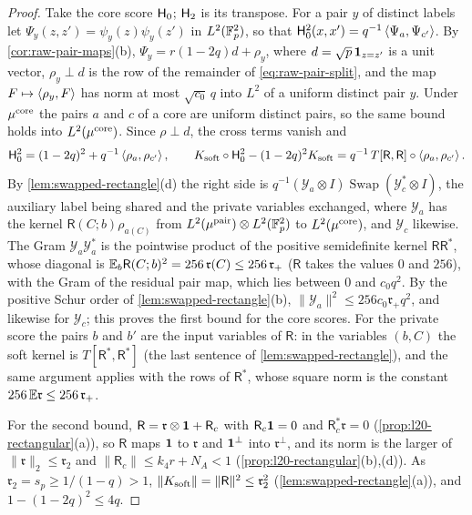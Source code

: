 \begin{proof}
Take the core score $\mathsf H_{0}$; $\mathsf H_{2}$ is its transpose. For a pair $y$ of distinct labels let
$\Psi_y(z,z')=\psi_y(z)\psi_y(z')$ in $L^2(\mathbb F_p^2)$, so that
$\mathsf H_{0}^2(x,x')=q^{-1}\left\langle \Psi_a,\Psi_{c'}\right\rangle$. By \cref{cor:raw-pair-maps}(b),
$\Psi_y=r(1-2q)d+\rho_y$, where $d=\sqrt p\,\mathbf 1_{z=z'}$ is a unit vector, $\rho_y\perp d$
is the row of the remainder of \eqref{eq:raw-pair-split}, and the map
$F\mapsto\left\langle \rho_y,F\right\rangle$ has norm at most $\sqrt{c_0}\,q$ into $L^2$ of a uniform distinct
pair $y$. Under $\mu^{\rm core}$ the pairs $a$ and $c$ of a core are uniform distinct
pairs, so the same bound holds into $L^2(\mu^{\rm core})$. Since $\rho\perp d$, the cross terms vanish and
\[
 \mathsf H_{0}^2=(1-2q)^2+q^{-1}\left\langle \rho_a,\rho_{c'}\right\rangle,\qquad
 K_{\rm soft}\circ\mathsf H_{0}^2-(1-2q)^2K_{\rm soft}
 =q^{-1}\,T[\mathsf R,\mathsf R]\circ\left\langle \rho_a,\rho_{c'}\right\rangle .
\]
By \cref{lem:swapped-rectangle}(d) the right side is
$q^{-1}(\mathcal Y_a\otimes I)\operatorname{Swap}(\mathcal Y_c^*\otimes I)$, the auxiliary
label being shared and the private variables exchanged, where $\mathcal Y_a$ has the kernel
$\mathsf R(C;b)\rho_{a(C)}$ from $L^2(\mu^{\rm pair})\otimes L^2(\mathbb F_p^2)$ to
$L^2(\mu^{\rm core})$, and $\mathcal Y_c$
likewise. The Gram $\mathcal Y_a\mathcal Y_a^*$ is the pointwise product of the positive
semidefinite kernel $\mathsf R\mathsf R^*$, whose diagonal is
$\mathbb E_b\mathsf R(C;b)^2=256\,\mathfrak r(C)\le256\,\mathfrak r_+$ ($\mathsf R$ takes the values
$0$ and $256$), with the Gram of the residual pair map, which lies between $0$ and
$c_0q^2$. By the positive Schur order of \cref{lem:swapped-rectangle}(b),
$\|\mathcal Y_a\|^2\le256c_0\mathfrak r_+q^2$, and likewise for $\mathcal Y_c$; this proves the
first bound for the core scores. For the private score the pairs $b$ and $b'$ are the input
variables of $\mathsf R$: in the variables $(b,C)$ the soft kernel is
$T[\mathsf R^*,\mathsf R^*]$ (the last sentence of \cref{lem:swapped-rectangle}), and the same
argument applies with the rows of $\mathsf R^*$, whose square norm is the constant
$256\,\mathbb E\mathfrak r\le256\,\mathfrak r_+$.

For the second bound, $\mathsf R=\mathfrak r\otimes\mathbf 1+\mathsf R_c$ with $\mathsf R_c\mathbf 1=0$
and $\mathsf R_c^*\mathfrak r=0$ (\cref{prop:l20-rectangular}(a)), so $\mathsf R$ maps $\mathbf 1$
to $\mathfrak r$ and $\mathbf 1^\perp$ into $\mathfrak r^\perp$, and its norm is the larger of
$\|\mathfrak r\|_2\le\mathfrak r_2$ and $\|\mathsf R_c\|\le k_4r+N_A<1$
(\cref{prop:l20-rectangular}(b),(d)). As $\mathfrak r_2=s_p\ge1/(1-q)>1$,
$\|K_{\rm soft}\|=\|\mathsf R\|^2\le\mathfrak r_2^2$ (\cref{lem:swapped-rectangle}(a)), and
$1-(1-2q)^2\le4q$.
\end{proof}

